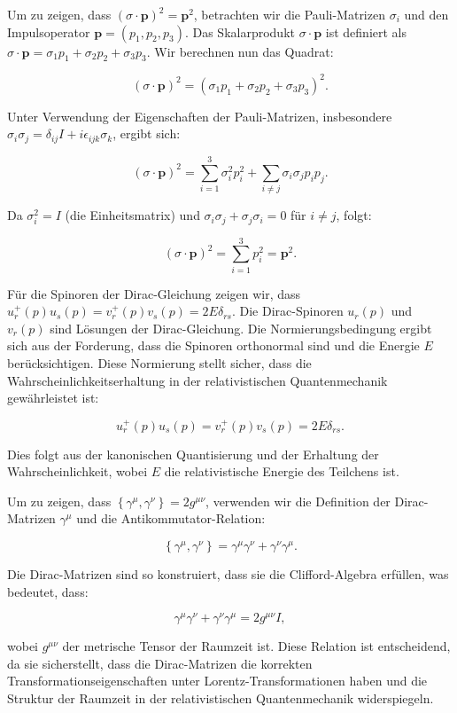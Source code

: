 Um zu zeigen, dass $(\sigma \cdot \mathbf{p})^2 = \mathbf{p}^2$, betrachten wir die Pauli-Matrizen $\sigma_i$ und den Impulsoperator $\mathbf{p} = (p_1, p_2, p_3)$. Das Skalarprodukt $\sigma \cdot \mathbf{p}$ ist definiert als $\sigma \cdot \mathbf{p} = \sigma_1 p_1 + \sigma_2 p_2 + \sigma_3 p_3$. Wir berechnen nun das Quadrat:

\[
(\sigma \cdot \mathbf{p})^2 = (\sigma_1 p_1 + \sigma_2 p_2 + \sigma_3 p_3)^2.
\]

Unter Verwendung der Eigenschaften der Pauli-Matrizen, insbesondere $\sigma_i \sigma_j = \delta_{ij} I + i \epsilon_{ijk} \sigma_k$, ergibt sich:

\[
(\sigma \cdot \mathbf{p})^2 = \sum_{i=1}^{3} \sigma_i^2 p_i^2 + \sum_{i \neq j} \sigma_i \sigma_j p_i p_j.
\]

Da $\sigma_i^2 = I$ (die Einheitsmatrix) und $\sigma_i \sigma_j + \sigma_j \sigma_i = 0$ für $i \neq j$, folgt:

\[
(\sigma \cdot \mathbf{p})^2 = \sum_{i=1}^{3} p_i^2 = \mathbf{p}^2.
\]

Für die Spinoren der Dirac-Gleichung zeigen wir, dass $u_r^{+}(p) u_s(p) = v_r^{+}(p) v_s(p) = 2 E \delta_{rs}$. Die Dirac-Spinoren $u_r(p)$ und $v_r(p)$ sind Lösungen der Dirac-Gleichung. Die Normierungsbedingung ergibt sich aus der Forderung, dass die Spinoren orthonormal sind und die Energie $E$ berücksichtigen. Diese Normierung stellt sicher, dass die Wahrscheinlichkeitserhaltung in der relativistischen Quantenmechanik gewährleistet ist:

\[
u_r^{+}(p) u_s(p) = v_r^{+}(p) v_s(p) = 2 E \delta_{rs}.
\]

Dies folgt aus der kanonischen Quantisierung und der Erhaltung der Wahrscheinlichkeit, wobei $E$ die relativistische Energie des Teilchens ist.

Um zu zeigen, dass $\left\{\gamma^\mu, \gamma^\nu\right\} = 2 g^{\mu \nu}$, verwenden wir die Definition der Dirac-Matrizen $\gamma^\mu$ und die Antikommutator-Relation:

\[
\left\{\gamma^\mu, \gamma^\nu\right\} = \gamma^\mu \gamma^\nu + \gamma^\nu \gamma^\mu.
\]

Die Dirac-Matrizen sind so konstruiert, dass sie die Clifford-Algebra erfüllen, was bedeutet, dass:

\[
\gamma^\mu \gamma^\nu + \gamma^\nu \gamma^\mu = 2 g^{\mu \nu} I,
\]

wobei $g^{\mu \nu}$ der metrische Tensor der Raumzeit ist. Diese Relation ist entscheidend, da sie sicherstellt, dass die Dirac-Matrizen die korrekten Transformationseigenschaften unter Lorentz-Transformationen haben und die Struktur der Raumzeit in der relativistischen Quantenmechanik widerspiegeln.